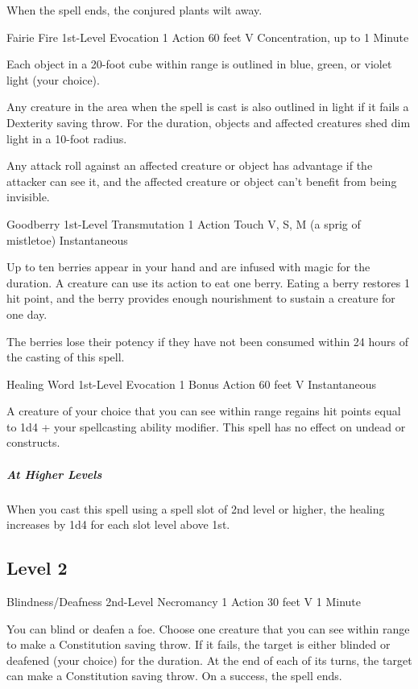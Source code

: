 {When the spell ends, the conjured plants wilt away.

\DndSpellHeader
  {Fairie Fire}
  {1st-Level Evocation}
  {1 Action}
  {60 feet}
  {V}
  {Concentration, up to 1 Minute}

Each object in a 20-foot cube within range is outlined in blue, green, or violet light (your choice).

Any creature in the area when the spell is cast is also outlined in light if it fails a Dexterity saving throw. For the duration, objects and affected creatures shed dim light in a 10-foot radius.

Any attack roll against an affected creature or object has advantage if the attacker can see it, and the affected creature or object can’t benefit from being invisible.

\DndSpellHeader
  {Goodberry}
  {1st-Level Transmutation}
  {1 Action}
  {Touch}
  {V, S, M (a sprig of mistletoe)}
  {Instantaneous}

Up to ten berries appear in your hand and are infused with magic for the duration. A creature can use its action to eat one berry. Eating a berry restores 1 hit point, and the berry provides enough nourishment to sustain a creature for one day.

The berries lose their potency if they have not been consumed within 24 hours of the casting of this spell.

\DndSpellHeader
  {Healing Word}
  {1st-Level Evocation}
  {1 Bonus Action}
  {60 feet}
  {V}
  {Instantaneous}

A creature of your choice that you can see within range regains hit points equal to 1d4 + your spellcasting ability modifier. This spell has no effect on undead or constructs.

\subparagraph*{At Higher Levels} When you cast this spell using a spell slot of 2nd level or higher, the healing increases by 1d4 for each slot level above 1st.

\subsection*{Level 2}

\DndSpellHeader
  {Blindness/Deafness}
  {2nd-Level Necromancy}
  {1 Action}
  {30 feet}
  {V}
  {1 Minute}

You can blind or deafen a foe. Choose one creature that you can see within range to make a Constitution saving throw. If it fails, the target is either blinded or deafened (your choice) for the duration. At the end of each of its turns, the target can make a Constitution saving throw. On a success, the spell ends.

}
